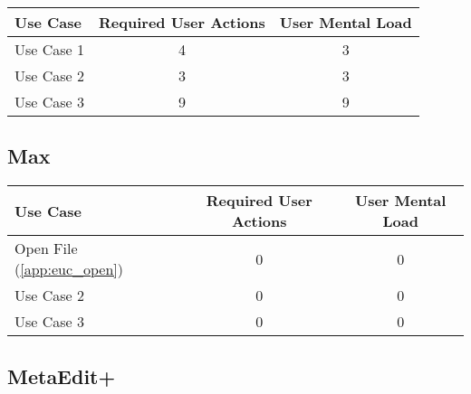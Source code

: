 \begin{tabularx}{\textwidth}{Xcc}
\textbf{Use Case} & \textbf{Required User Actions} & \textbf{User Mental Load}\\
\hline
Use Case 1                          & 4 & 3 \\
Use Case 2                          & 3 & 3 \\
Use Case 3                          & 9 & 9
\end{tabularx}

\subsection*{Max}

\begin{tabularx}{\textwidth}{Xcc}
\textbf{Use Case} & \textbf{Required User Actions} & \textbf{User Mental Load}\\
\hline
Open File (\ref{app:euc_open}) & {\color{red}0} & {\color{red}0} \\
Use Case 2                     & {\color{red}0} & {\color{red}0} \\
Use Case 3                     & {\color{red}0} & {\color{red}0}
\end{tabularx}

\subsection*{MetaEdit+}




